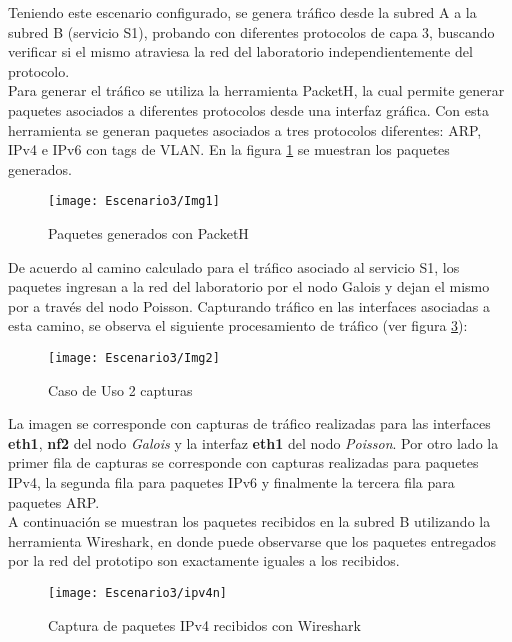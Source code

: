Teniendo este escenario configurado, se genera tr\'afico desde la subred A a la subred B (servicio S1), probando con diferentes protocolos de capa 3, buscando verificar si el mismo atraviesa la red del laboratorio independientemente del protocolo. \\

Para generar el tr\'afico se utiliza la herramienta PacketH\cite{PacketH}, la cual permite generar paquetes asociados a diferentes protocolos desde una interfaz gr\'afica. Con esta herramienta se generan paquetes asociados a tres protocolos diferentes: ARP, IPv4 e IPv6 con tags de VLAN. En la figura \ref{fig:PaquetsSend} se muestran los paquetes generados.\\

\begin{figure}[h!] 
\centering    
\texttt{[image: Escenario3/Img1]}
\caption[Paquetes generados con PacketH]{Paquetes generados con PacketH}
\label{fig:PaquetsSend}
\end{figure}

De acuerdo al camino calculado para el tr\'afico asociado al servicio S1, los paquetes ingresan a la red del laboratorio por el nodo Galois y dejan el mismo por a través del nodo Poisson. Capturando tr\'afico en las interfaces asociadas a esta camino, se observa el siguiente procesamiento de tr\'afico (ver figura \ref{fig:CapturaTCP}):

\begin{figure}[h!] 
\centering    
\texttt{[image: Escenario3/Img2]}
\caption[Caso de Uso 2 capturas]{Caso de Uso 2 capturas}
\label{fig:CapturaTCP}
\end{figure}

La imagen se corresponde con capturas de tr\'afico realizadas para las interfaces \textbf{eth1}, \textbf{nf2} del nodo \textit{Galois} y la interfaz \textbf{eth1} del nodo \textit{Poisson}. Por otro lado la primer fila de capturas se corresponde con capturas realizadas para paquetes IPv4, la segunda fila para paquetes IPv6 y finalmente la tercera fila para paquetes ARP.\\

A continuaci\'on se muestran los paquetes recibidos en la subred B utilizando la herramienta Wireshark, en donde puede observarse que los paquetes entregados por la red del prototipo son exactamente iguales a los recibidos.

\newpage
\begin{figure}[h!] 
\centering    
\texttt{[image: Escenario3/ipv4n]}
\caption[Captura de paquetes IPv4 recibidos con Wireshark]{Captura de paquetes IPv4 recibidos con Wireshark}
\label{fig:CapturaTCP}
\end{figure}

